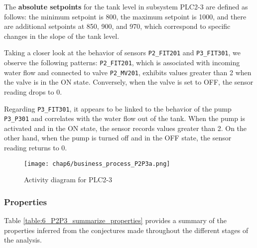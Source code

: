 The \textbf{absolute setpoints} for the tank level in subsystem PLC2-3 are defined as follows: the minimum setpoint is 800, the maximum setpoint is 1000, and there are additional setpoints at 850, 900, and 970, which correspond to specific changes in the slope of the tank level.

\bigskip
Taking a closer look at the behavior of sensors \texttt{P2\_FIT201} and \texttt{P3\_FIT301}, we observe the following patterns: \texttt{P2\_FIT201}, which is associated with incoming water flow and connected to valve \texttt{P2\_MV201}, exhibits values greater than 2 when the valve is in the ON state. Conversely, when the valve is set to OFF, the sensor reading drops to 0.

Regarding \texttt{P3\_FIT301}, it appears to be linked to the behavior of the pump \texttt{P3\_P301} and correlates with the water flow out of the tank. When the pump is activated and in the ON state, the sensor records values greater than 2. On the other hand, when the pump is turned off and in the OFF state, the sensor reading returns to 0.

\pagebreak
\begin{figure}[H]
	\centering
	\texttt{[image: chap6/business\_process\_P2P3a.png]}
	\caption{Activity diagram for PLC2-3}
	\label{fig:6_P2P3_process_mining}
\end{figure}
\pagebreak

\vfill

\subsubsection{Properties}
\label{subsubsec:6_P2P3_summary_table}
Table \ref{table:6_P2P3_summarize_properties} provides a summary of the properties inferred from the conjectures made throughout the different stages of the analysis.

